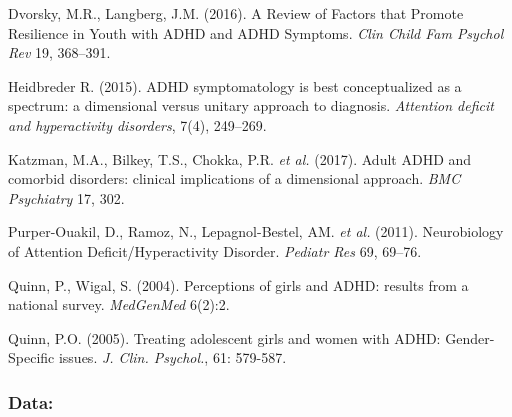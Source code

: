 \documentclass[
]{article}
\begin{document}
Dvorsky, M.R., Langberg, J.M. (2016). A Review of Factors that Promote
Resilience in Youth with ADHD and ADHD Symptoms. \emph{Clin Child Fam
Psychol Rev} 19, 368--391.

Heidbreder R. (2015). ADHD symptomatology is best conceptualized as a
spectrum: a dimensional versus unitary approach to diagnosis.
\emph{Attention deficit and hyperactivity disorders}, 7(4), 249--269.

Katzman, M.A., Bilkey, T.S., Chokka, P.R. \emph{et al.} (2017). Adult
ADHD and comorbid disorders: clinical implications of a dimensional
approach. \emph{BMC Psychiatry} 17, 302.

Purper-Ouakil, D., Ramoz, N., Lepagnol-Bestel, AM. \emph{et al.} (2011).
Neurobiology of Attention Deficit/Hyperactivity Disorder. \emph{Pediatr
Res} 69, 69--76.

Quinn, P., Wigal, S. (2004). Perceptions of girls and ADHD: results from
a national survey. \emph{MedGenMed} 6(2):2.

Quinn, P.O. (2005). Treating adolescent girls and women with ADHD:
Gender-Specific issues. \emph{J. Clin. Psychol.}, 61: 579-587.

\hypertarget{data-1}{%
\subsubsection{Data:}\label{data-1}}
\end{document}
